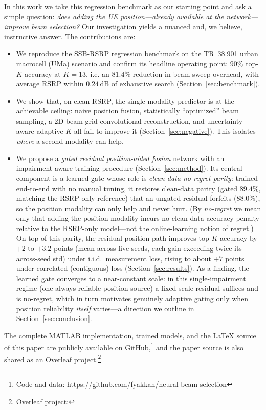 \documentclass[conference]{IEEEtran}
\begin{document}
In this work we take this regression benchmark as our starting point and ask a
simple question: \emph{does adding the UE position---already available at the
network---improve beam selection?} Our investigation yields a nuanced and, we
believe, instructive answer. The contributions are:
\begin{itemize}
\item We reproduce the SSB-RSRP regression benchmark on the TR~38.901 urban
macrocell (UMa) scenario and confirm its headline operating point: $90\%$
top-$K$ accuracy at $K=13$, i.e. an $81.4\%$ reduction in beam-sweep overhead,
with average RSRP within $0.24$\,dB of exhaustive search
(Section~\ref{sec:benchmark}).
\item We show that, on clean RSRP, the single-modality predictor is at the
achievable ceiling: naive position fusion, statistically ``optimized'' beam
sampling, a 2D beam-grid convolutional reconstruction, and uncertainty-aware
adaptive-$K$ all fail to improve it (Section~\ref{sec:negative}). This isolates
\emph{where} a second modality can help.
\item We propose a \emph{gated residual position-aided fusion} network with an
impairment-aware training procedure (Section~\ref{sec:method}). Its central
component is a learned gate whose role is \emph{clean-data no-regret parity}:
trained end-to-end with no manual tuning, it restores clean-data parity (gated
$89.4\%$, matching the RSRP-only reference) that an ungated residual forfeits
($88.0\%$), so the position modality can only help and never hurt. (By \emph{no-regret} we mean only that adding the
position modality incurs no clean-data accuracy penalty relative to the RSRP-only
model---not the online-learning notion of regret.) On top of this parity, the
residual position path improves top-$K$ accuracy by $+2$ to $+3.2$ points (mean
across five seeds, each gain exceeding twice its across-seed std) under i.i.d.\
measurement loss, rising to about $+7$ points under correlated (contiguous) loss
(Section~\ref{sec:results}). As a finding, the learned gate
converges to a near-constant scale: in this single-impairment regime (one
always-reliable position source) a fixed-scale residual suffices and is
no-regret, which in turn motivates genuinely adaptive gating only when position
reliability \emph{itself} varies---a direction we outline in
Section~\ref{sec:conclusion}.
\end{itemize}

The complete MATLAB implementation, trained models, and the \LaTeX{} source of
this paper are publicly available on
GitHub,\footnote{Code and data: \url{https://github.com/fyakkan/neural-beam-selection}}
and the paper source is also shared as an Overleaf
project.\footnote{Overleaf project: \overleafurl}
\end{document}

